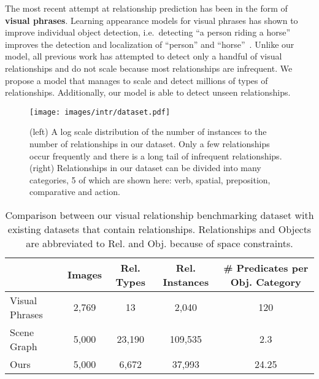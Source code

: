 \documentclass[runningheads]{llncs}
\begin{document}
The most recent attempt at relationship prediction has been in the form of \textbf{visual phrases}. Learning appearance models for visual phrases has shown to improve individual object detection, i.e.\ detecting ``a person riding a horse'' improves the detection and localization of ``person'' and ``horse''~\cite{sadeghi2011recognition,choi2013understanding}.  Unlike our model, all previous work has attempted to detect only a handful of visual relationships and do not scale because most relationships are infrequent. We propose a model that manages to scale and detect millions of types of relationships. Additionally, our model is able to detect unseen relationships.

\begin{figure*}[t]
\centering
\setlength{\belowcaptionskip}{-10pt}
\texttt{[image: images/intr/dataset.pdf]}
\vspace{-0.1in}
\caption{(left) A log scale distribution of the number of instances to the number of relationships in our dataset. Only a few relationships occur frequently and there is a long tail of infrequent relationships. (right) Relationships in our dataset can be divided into many categories, 5 of which are shown here: verb, spatial, preposition, comparative and action.}
\label{fig:dataset}
\end{figure*}

 
\begin{table}[t]
\begin{center}
\small
\caption{Comparison between our visual relationship benchmarking dataset with existing datasets that contain relationships. Relationships and Objects are abbreviated to Rel. and Obj. because of space constraints.}
\label{tab:dataset}
\begin{tabular}{l | c | c | c | c}
  & Images & Rel. Types & Rel. Instances & \# Predicates per Obj. Category\\
  \hline
  Visual Phrases~\cite{sadeghi2011recognition} & 2,769 & 13 & 2,040 & 120\\
  Scene Graph~\cite{Johnson2015Image} & 5,000 & 23,190 & 109,535 & 2.3 \\
  \hline
  Ours & 5,000 & 6,672 & 37,993 & 24.25\\
\end{tabular}
\end{center}
\end{table}
 
\end{document}
